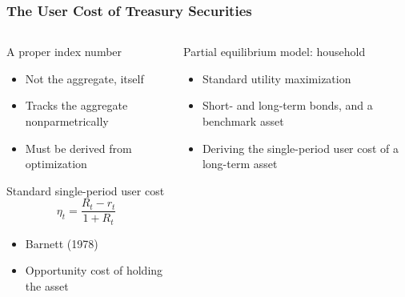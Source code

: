 \documentclass[11pt, handout, aspectratio=169]{beamer}
\newenvironment{wideitemize}{\itemize\addtolength{\itemsep}{10pt}}{\enditemize}
\begin{document}
\begin{frame}
\frametitle{The User Cost of Treasury Securities}
\begin{columns}[t]
	\begin{column}{0.49\textwidth}
		\begin{wideitemize}
			\item A proper index number
			\begin{itemize}
				\item Not the aggregate, itself
				\item Tracks the aggregate nonparmetrically
				\item Must be derived from optimization 
			\end{itemize}
			\item Standard single-period user cost
				$$\eta_t = \frac{R_t-r_t}{1+R_t}$$
			\begin{itemize}
				\item Barnett (1978)
				\item Opportunity cost of holding the asset
			\end{itemize}
		\end{wideitemize}	
	\end{column}
	\hfill
	\begin{column}{0.49\textwidth}
		\begin{wideitemize}
			\item Partial equilibrium model: household
			\begin{itemize}
				\item Standard utility maximization
				\item Short- and long-term bonds, and a benchmark asset
			\end{itemize}
			\item {\bf \color{WeberPurple}{Contribution}}
			\begin{itemize}
				\item Deriving the single-period user cost of a long-term asset
			\end{itemize}
		\end{wideitemize}
	\end{column}
\end{columns}
\end{frame}
\end{document}
